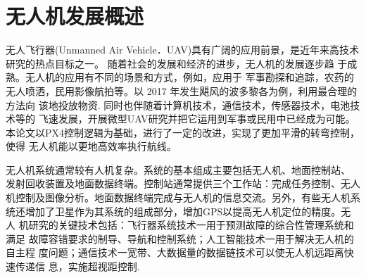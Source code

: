 \documentclass[UTF8,a4paper,10pt,nocolorlinks]{ctexart}
\begin{document}
    \setcounter{page}{1}        %
    \pagestyle{teststyle}
    \section{无人机发展概述}
    无人飞行器(Unmanned Air Vehicle．UAV)具有广阔的应用前景，是近年来高技术研究的热点目标之一。
    随着社会的发展和经济的进步，无人机的发展逐步趋
于成熟。无人机的应用有不同的场景和方式，例如，应用于
军事勘探和追踪，农药的无人喷洒，民用影像航拍等。以
2017 年发生飓风的波多黎各为例，利用最合理的方法向
该地投放物资. 同时也伴随着计算机技术，通信技术，传感器技术，电池技术等的
    飞速发展，开展微型UAV研究并把它运用到军事或民用中已经成为可能。
    本论文以PX4控制逻辑为基础，进行了一定的改进，实现了更加平滑的转弯控制，使得
    无人机能以更地高效率执行航线。\par
    无人机系统通常较有人机复杂。系统的基本组成主要包括无人机、地面控制站、
发射回收装置及地面数据终端。控制站通常提供三个工作站：完成任务控制、无人
机控制及图像分析。地面数据终端完成与无人机的信息交流。另外，有些无人机系
统还增加了卫星作为其系统的组成部分，增加GPS以提高无人机定位的精度。无人
机研究的关键技术包括：飞行器系统技术一用于预测故障的综合性管理系统和满足
故障容错要求的制导、导航和控制系统；人工智能技术一用于解决无人机的自主程
度问题；通信技术一宽带、大数据量的数据链技术可以使无人机远距离快速传递信
息，实施超视距控制.
\end{document}
